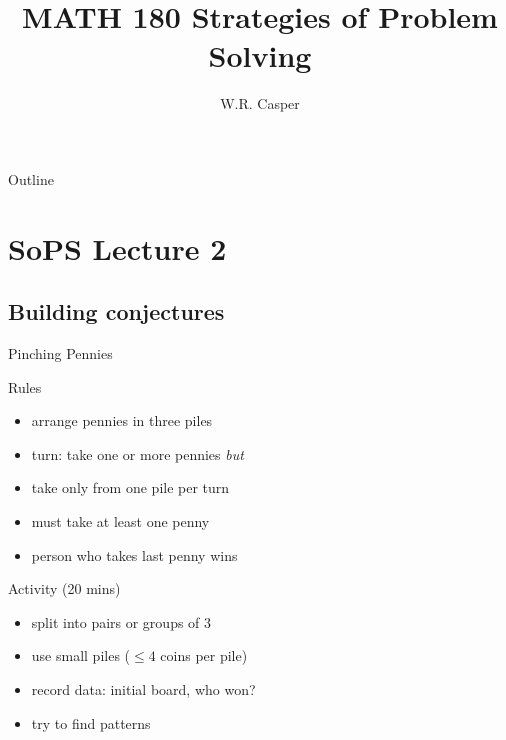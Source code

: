 \documentclass{beamer}
\title{MATH 180 Strategies of Problem Solving}
\subtitle
{} %
\author[W.R. Casper] %
{W.R. Casper}
\institute[California State University Fullerton] %
{
  Department of Mathematics\\
  California State University Fullerton}
\begin{document}
\begin{frame}
  \titlepage
\end{frame}

\begin{frame}{Outline}
  \tableofcontents
\end{frame}



\section{SoPS Lecture 2}
\subsection{Building conjectures}

\begin{frame}{Pinching Pennies}
  \begin{block}{Rules}
    \begin{itemize}
      \item arrange pennies in three piles
      \item turn: take one or more pennies \emph{but}
      \item take only from one pile per turn
      \item must take at least one penny
      \item person who takes last penny wins
    \end{itemize}
  \end{block}
\pause
  \begin{block}{Activity (20 mins)}
    \begin{itemize}
\pause
      \item split into pairs or groups of 3
\pause
      \item use small piles ($\leq 4$ coins per pile)
\pause
      \item {\color{red}record data:} initial board, who won? 
\pause
      \item try to find {\color{blue}patterns}
    \end{itemize}
  \end{block}
\end{frame}
\end{document}
